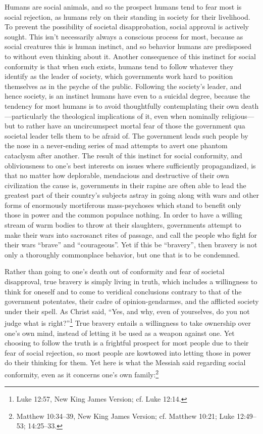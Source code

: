 \documentclass[letterpaper,12pt]{article}
\begin{document}
Humans are social animals, and so the prospect humans tend to fear most is social rejection, as humans rely on their standing in society for their livelihood. To prevent the possibility of societal disapprobation, social approval is actively sought. This isn't necessarily always a conscious process for most, because as social creatures this is human instinct, and so behavior humans are predisposed to without even thinking about it. Another consequence of this instinct for social conformity is that when such exists, humans tend to follow whatever they identify as the leader of society, which governments work hard to position themselves as in the psyche of the public. Following the society's leader, and hence society, is an instinct humans have even to a suicidal degree, because the tendency for most humans is to avoid thoughtfully contemplating their own death---particularly the theological implications of it, even when nominally religious---but to rather have an uncircumspect mortal fear of those the government qua societal leader tells them to be afraid of. The government leads such people by the nose in a never-ending series of mad attempts to avert one phantom cataclysm after another. The result of this instinct for social conformity, and obliviousness to one's best interests on issues where sufficiently propagandized, is that no matter how deplorable, mendacious and destructive of their own civilization the cause is, governments in their rapine are often able to lead the greatest part of their country's subjects astray in going along with wars and other forms of enormously mortiferous mass-psychoses which stand to benefit only those in power and the common populace nothing. In order to have a willing stream of warm bodies to throw at their slaughters, governments attempt to make their wars into sacrosanct rites of passage, and call the people who fight for their wars ``brave'' and ``courageous''. Yet if this be ``bravery'', then bravery is not only a thoroughly commonplace behavior, but one that is to be condemned.

Rather than going to one's death out of conformity and fear of societal disapproval, true bravery is simply living in truth, which includes a willingness to think for oneself and to come to veridical conclusions contrary to that of the government potentates, their cadre of opinion-gendarmes, and the afflicted society under their spell. As Christ said, ``Yes, and why, even of yourselves, do you not judge what is right?''\footnote{Luke 12:57, New King James Version; cf. Luke 12:14.} True bravery entails a willingness to take ownership over one's own mind, instead of letting it be used as a weapon against one. Yet choosing to follow the truth is a frightful prospect for most people due to their fear of social rejection, so most people are kowtowed into letting those in power do their thinking for them. Yet here is what the Messiah said regarding social conformity, even as it concerns one's own family:\footnote{Matthew 10:34--39, New King James Version; cf. Matthew 10:21; Luke 12:49--53; 14:25--33.}
\end{document}
